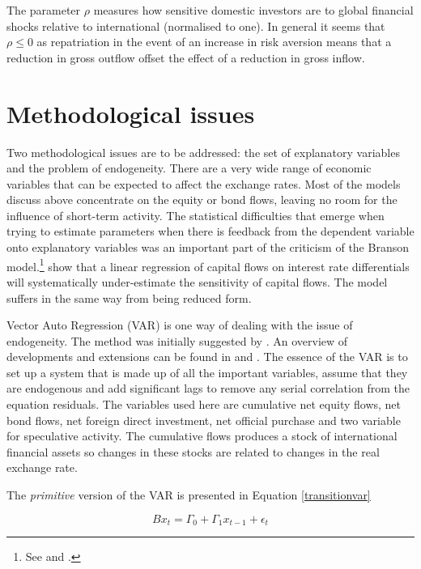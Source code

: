 \documentclass[12pt, a4paper, oneside]{article}\usepackage[]{graphicx}\usepackage[]{color}
\begin{document}
The parameter $\rho$ measures how sensitive domestic investors are to global financial shocks relative to international (normalised to one). In general it seems that $\rho \leq 0$ as repatriation in the event of an increase in risk aversion means that a reduction in gross outflow offset the effect of a reduction in gross inflow.  

\section{Methodological issues}
Two methodological issues are to be addressed: the set of explanatory variables and the problem of endogeneity. There are a very wide range of economic variables that can be expected to affect the exchange rates.   Most of the models discuss above concentrate on the equity or bond flows, leaving no room for the influence of short-term activity.  The statistical difficulties that emerge when trying to estimate parameters when there is feedback from the dependent variable onto explanatory variables was an important part of the criticism of the Branson model.\footnote{See \citet{Branson1968} and \citet{Branson1971}.}  \citet{Kouri1974International} show that a linear regression of capital flows on interest rate differentials will systematically under-estimate the sensitivity of capital flows. The \citet{brookscapital} model suffers in the same way from being reduced form.   

Vector Auto Regression (VAR) is one way of dealing with the issue of endogeneity.  The method was initially suggested by \citet{Sims1980Macroeconomics}.  An overview of developments and extensions can be found in \citet{lutkepohlvar} and \citet{Hamilton}.  The essence of the VAR is to set up a system that is made up of all the important variables, assume that they are endogenous and add significant lags to remove any serial correlation from the equation residuals.   The variables used here are cumulative net equity flows, net bond flows, net foreign direct investment, net official purchase and two variable for speculative activity. The cumulative flows produces a stock of international financial assets so changes in these stocks are related to changes in the real exchange rate.  

The \emph{primitive} version of the VAR is presented in Equation \ref{transitionvar} 

\begin{equation}\label{transitionvar}
Bx_{t}=\Gamma_{0}+\Gamma_{1}x_{t-1}+\epsilon_{t}
\end{equation}
\end{document}
